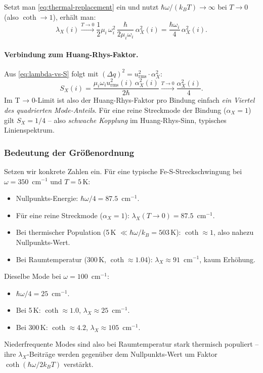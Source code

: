 \documentclass[11pt,a4paper,twoside]{article}
\theoremstyle{remark}
\begin{document}
Setzt man \eqref{eq:thermal-replacement} ein und nutzt
$\hbar\omega/(k_BT) \to \infty$ bei $T \to 0$ (also $\coth \to 1$),
erh\"alt man:
\begin{equation}
  \lambda_X(i) \xrightarrow{T \to 0}
  \frac{1}{2}\mu_i\,\omega_i^2\,\frac{\hbar}{2\mu_i\omega_i}\,\alpha_X^2(i)
  = \frac{\hbar\omega_i}{4}\,\alpha_X^2(i).
  \label{eq:lambda-zero-T}
\end{equation}

\paragraph{Verbindung zum Huang-Rhys-Faktor.}
Aus \eqref{eq:lambda-vs-S} folgt mit $(\Delta q)^2 = u_\text{rms}^2 \cdot \alpha_X^2$:
\begin{equation}
  S_X(i) = \frac{\mu_i\omega_i u_\text{rms}^2(i)\,\alpha_X^2(i)}{2\hbar}
  \xrightarrow{T \to 0} \frac{\alpha_X^2(i)}{4}.
\end{equation}
Im T → 0-Limit ist also der Huang-Rhys-Faktor pro Bindung
einfach \emph{ein Viertel des quadrierten Mode-Anteils}. F\"ur eine
reine Streckmode der Bindung ($\alpha_X = 1$) gilt
$S_X = 1/4$ -- also \emph{schwache Kopplung} im Huang-Rhys-Sinn,
typisches Linienspektrum.

\subsubsection*{Bedeutung der Gr\"o{\ss}enordnung}

Setzen wir konkrete Zahlen ein. F\"ur eine typische
Fe-S-Streckschwingung bei $\omega = 350$~cm$^{-1}$ und $T = 5$\,K:
\begin{itemize}\setlength{\itemsep}{0pt}
  \item Nullpunkts-Energie: $\hbar\omega/4 = 87.5$~cm$^{-1}$.
  \item F\"ur eine reine Streckmode ($\alpha_X = 1$):
        $\lambda_X(T \to 0) = 87.5$~cm$^{-1}$.
  \item Bei thermischer Population (5\,K $\ll \hbar\omega/k_B = 503$\,K):
        $\coth \approx 1$, also nahezu Nullpunkts-Wert.
  \item Bei Raumtemperatur (300\,K, $\coth \approx 1.04$):
        $\lambda_X \approx 91$~cm$^{-1}$, kaum Erh\"ohung.
\end{itemize}

Dieselbe Mode bei $\omega = 100$~cm$^{-1}$:
\begin{itemize}\setlength{\itemsep}{0pt}
  \item $\hbar\omega/4 = 25$~cm$^{-1}$.
  \item Bei 5\,K: $\coth \approx 1.0$, $\lambda_X \approx 25$~cm$^{-1}$.
  \item Bei 300\,K: $\coth \approx 4.2$, $\lambda_X \approx 105$~cm$^{-1}$.
\end{itemize}
Niederfrequente Modes sind also bei Raumtemperatur stark thermisch
populiert -- ihre $\lambda_X$-Beitr\"age werden gegen\"uber dem
Nullpunkts-Wert um Faktor $\coth(\hbar\omega/2k_BT)$ verst\"arkt.
\end{document}
